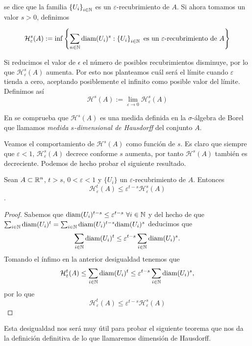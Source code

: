 se dice que la familia $\left\lbrace U_i\right\rbrace_{i\in\mathbb{N}}$ es un $\varepsilon$-recubrimiento de $A$. Si ahora tomamos un valor $s>0$, definimos

$$
\mathcal{H}_\varepsilon^s(A):=\inf\left\lbrace\sum_{n\in\mathbb{N}} \mathrm{diam}(U_i)^s: \left\lbrace U_i\right\rbrace_{i\in\mathbb{N}} \text{ es un }\varepsilon\text{-recubrimiento de }A\right\rbrace
$$

Si reducimos el valor de $\epsilon$ el número de posibles recubrimientos disminuye, por lo que $\mathcal{H}_\varepsilon^s(A)$ aumenta. Por esto nos planteamos cuál será el límite cuando $\varepsilon$ tienda a cero, aceptando posiblemente el infinito como posible valor del límite. Definimos así 
$$
\mathcal{H}^s(A) := \lim_{\varepsilon\rightarrow 0}\mathcal{H}_\varepsilon^s(A)
$$

En \cite[Secciones 5.2 y 5.4]{alma991007022459704990} se comprueba que $\mathcal{H}^s(A)$ es una medida definida en la $\sigma$-álgebra de Borel que llamamos \textit{medida $s$-dimensional de Hausdorff} del conjunto $A$.

Veamos el comportamiento de $\mathcal{H}^s(A)$ como función de $s$. Es claro que siempre que $\varepsilon < 1$, $\mathcal{H}_\varepsilon^s(A)$ decrece conforme $s$ aumenta, por tanto $\mathcal{H}^s(A)$ también es decreciente. Podemos de hecho probar el siguiente resultado.

\begin{proposicion}
  \label{prop:desigualdad}
  Sean $A\subset \mathbb{R}^n$, $t>s$, $0<\varepsilon<1$ y $\{U_i\}$ un $\varepsilon$-recubrimiento de $A$. Entonces 
  $$\mathcal{H}_\varepsilon^t(A)\leq \varepsilon^{t-s}\mathcal{H}_\varepsilon^s(A)$$. 
\end{proposicion}
\begin{proof}
  Sabemos que $\mathrm{diam}(U_i)^{t-s}\leq\varepsilon^{t-s} \ \forall i\in \mathbb{N}$ y del hecho de que $\sum_{i\in\mathbb{N}}\mathrm{diam}(U_i)^t=\sum_{i\in\mathbb{N}}\mathrm{diam}(U_i)^{t-s}\mathrm{diam}(U_i)^s$ deducimos que 
  $$
  \sum_{i\in\mathbb{N}}\mathrm{diam}(U_i)^t\leq\varepsilon^{t-s}\sum_{i\in\mathbb{N}}\mathrm{diam}(U_i)^{s}.
  $$
  Tomando el ínfimo en la anterior desigualdad tenemos que
  $$
  \mathcal{H}_\varepsilon^t(A)\leq\sum_{i\in\mathbb{N}}\mathrm{diam}(U_i)^t\leq\varepsilon^{t-s}\sum_{i\in\mathbb{N}}\mathrm{diam}(U_i)^{s},
  $$
  por lo que
  $$\mathcal{H}_\varepsilon^t(A)\leq \varepsilon^{t-s}\mathcal{H}_\varepsilon^s(A)$$

\end{proof}

Esta desigualdad nos será muy útil para probar el siguiente teorema que nos da la definición definitiva de lo que llamaremos dimensión de Hausdorff.


